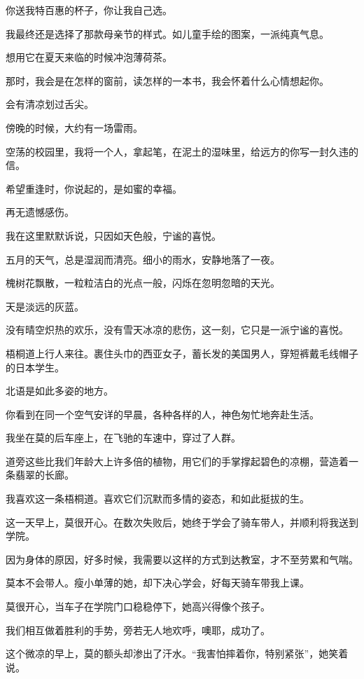 \documentclass[12pt,a4paper]{article}
\begin{document}
		你送我特百惠的杯子，你让我自己选。\par
		我最终还是选择了那款母亲节的样式。如儿童手绘的图案，一派纯真气息。\par
		想用它在夏天来临的时候冲泡薄荷茶。\par
		那时，我会是在怎样的窗前，读怎样的一本书，我会怀着什么心情想起你。\par
		会有清凉划过舌尖。\par
		傍晚的时候，大约有一场雷雨。\par
		空荡的校园里，我将一个人，拿起笔，在泥土的湿味里，给远方的你写一封久违的信。

		希望重逢时，你说起的，是如蜜的幸福。\par
		再无遗憾感伤。

	\endwriting



		我在这里默默诉说，只因如天色般，宁谧的喜悦。


		五月的天气，总是湿润而清亮。细小的雨水，安静地落了一夜。\par
		槐树花飘散，一粒粒洁白的光点一般，闪烁在忽明忽暗的天光。\par
		天是淡远的灰蓝。\par
		没有晴空炽热的欢乐，没有雪天冰凉的悲伤，这一刻，它只是一派宁谧的喜悦。\par
		梧桐道上行人来往。裹住头巾的西亚女子，蓄长发的美国男人，穿短裤戴毛线帽子的日本学生。\par
		北语是如此多姿的地方。\par
		你看到在同一个空气安详的早晨，各种各样的人，神色匆忙地奔赴生活。

		我坐在莫的后车座上，在飞驰的车速中，穿过了人群。\par
		道旁这些比我们年龄大上许多倍的植物，用它们的手掌撑起碧色的凉棚，营造着一条翡翠的长廊。\par
		我喜欢这一条梧桐道。喜欢它们沉默而多情的姿态，和如此挺拔的生。\par
		这一天早上，莫很开心。在数次失败后，她终于学会了骑车带人，并顺利将我送到学院。\par
		因为身体的原因，好多时候，我需要以这样的方式到达教室，才不至劳累和气喘。\par
		莫本不会带人。瘦小单薄的她，却下决心学会，好每天骑车带我上课。\par
		莫很开心，当车子在学院门口稳稳停下，她高兴得像个孩子。\par
		我们相互做着胜利的手势，旁若无人地欢呼，噢耶，成功了。\par
		这个微凉的早上，莫的额头却渗出了汗水。“我害怕摔着你，特别紧张”，她笑着说。
\end{document}
